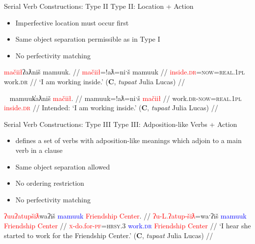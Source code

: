\begin{frame}[fragile]{Serial Verb Constructions: Type II}
Type II: Location + Action

\begin{itemize}
\item Imperfective location must occur first
\item Same object separation permissible as in Type I
\item No perfectivity matching
\end{itemize}

\ex[exno=17]
\begingl
\glpreamble \textcolor{red}{mačiił}ʔaƛniš mamuuk. //
\gla \textcolor{red}{mačiił}=!aƛ=niˑš mamuuk  //
\glb \textcolor{red}{inside.\textsc{dr}}=\textsc{now}=\textsc{real.1pl} work.\textsc{dr} //
\glft `I am working inside.' (\textbf{C}, \textit{tupaat} Julia Lucas) //
\endgl \label{ex:insideworking}
\xe

\ex[exno=18]~
\begingl
\glpreamble *mamuuk̓aƛniš \textcolor{red}{mačiił}. //
\gla mamuuk=!aƛ=niˑš \textcolor{red}{mačiił} //
\glb work.\textsc{dr}-\textsc{now}=\textsc{real.1pl} \textcolor{red}{inside.\textsc{dr}} //
\glft Intended: `I am working inside.' (\textbf{C}, \textit{tupaat} Julia Lucas) //
\endgl \label{ex:*insideworking}
\xe

\begin{comment}
\ex~
\begingl
\glpreamble \textcolor{red}{hiłqii}mitʔišʔał \textcolor{blue}{huuxsʔatu} \textcolor{red}{nučii}. //
\gla \textcolor{red}{hił-qii}=(m)it=ʔiˑš=ʔaˑł \textcolor{blue}{huuxsʔatu} \textcolor{red}{nuč-iˑ} //
\glb \textcolor{red}{be.at-on.top}=\textsc{pst}=\textsc{strg.3}=\textsc{habit} \textcolor{blue}{rest.\textsc{dr}} \textcolor{red}{mountain-\textsc{nmlz}} //
\glft `He rests on top of mountains.' (\textbf{N}, Fidelia Haiyupis) //
\endgl \label{ex:restonmountains}
\xe
\end{comment}
\end{frame}

\begin{frame}{Serial Verb Constructions: Type III}
Type III: Adposition-like Verbs + Action

\begin{itemize}
\item \cite{woo2007b} defines a set of verbs with adposition-like meanings which adjoin to a main verb in a clause
\item Same object separation allowed
\item No ordering restriction
\item No perfectivity matching
\end{itemize}

\ex[exno=19]
\begingl
\glpreamble \textcolor{red}{ʔuuʔatupšiƛ}waʔiš \textcolor{blue}{mamuuk} \textcolor{red}{Friendship Center}. //
\gla \textcolor{red}{ʔu-L.ʔatup-šiƛ}=waˑʔiš \textcolor{blue}{mamuuk} \textcolor{red}{Friendship Center} //
\glb \textcolor{red}{\textsc{x}-do.for-\textsc{pf}}=\textsc{hrsy.3} \textcolor{blue}{work.\textsc{dr}} \textcolor{red}{Friendship Center} //
\glft `I hear she started to work for the Friendship Center.' (\textbf{C}, \textit{tupaat} Julia Lucas) //
\endgl \label{ex:starttoworkfor2}
\xe

\end{frame}

